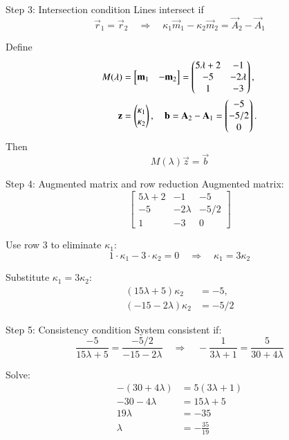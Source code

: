 \documentclass{beamer}
\begin{document}
\begin{frame}{Step 3: Intersection condition}
Lines intersect if
\[
\vec r_1 = \vec r_2 \quad \Rightarrow \quad \kappa_1 \vec m_1 - \kappa_2 \vec m_2 = \vec A_2 - \vec A_1
\]

Define
\begin{align}
M(\lambda) &= \begin{bmatrix}\mathbf m_1 & -\mathbf m_2\end{bmatrix} 
= \begin{pmatrix}5\lambda+2 & -1\\ -5 & -2\lambda\\ 1 & -3\end{pmatrix},\\
\mathbf z &= \begin{pmatrix}\kappa_1\\\kappa_2\end{pmatrix}, \quad
\mathbf b = \mathbf A_2 - \mathbf A_1 = \begin{pmatrix}-5\\-5/2\\0\end{pmatrix}.
\end{align}
Then
\[
M(\lambda)\vec z = \vec b
\]
\end{frame}

\begin{frame}{Step 4: Augmented matrix and row reduction}
Augmented matrix:
\[
\left[\begin{array}{cc|c}
5\lambda+2 & -1 & -5 \\
-5 & -2\lambda & -5/2 \\
1 & -3 & 0
\end{array}\right]
\]

Use row 3 to eliminate \(\kappa_1\):
\[
1\cdot \kappa_1 - 3\cdot \kappa_2 = 0 \quad \Rightarrow \quad \kappa_1 = 3 \kappa_2
\]

Substitute \(\kappa_1 = 3 \kappa_2\):
\begin{align}
(15\lambda+5)\kappa_2 &= -5,\\
(-15-2\lambda)\kappa_2 &= -5/2
\end{align}
\end{frame}

\begin{frame}{Step 5: Consistency condition}
System consistent if:
\[
\frac{-5}{15\lambda+5} = \frac{-5/2}{-15-2\lambda} 
\quad \Rightarrow \quad -\frac{1}{3\lambda+1} = \frac{5}{30+4\lambda}
\]

Solve:
\begin{align}
-(30+4\lambda) &= 5(3\lambda+1) \\
-30-4\lambda &= 15\lambda + 5 \\
19\lambda &= -35 \\
\boxed{\lambda} &= -\frac{35}{19}
\end{align}
\end{frame}
\end{document}
